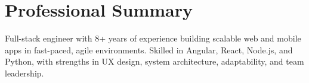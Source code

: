 \section{Professional Summary}
\noindent \normalsize Full-stack engineer with 8+ years of experience building scalable web and mobile apps in fast-paced, agile environments. Skilled in Angular, React, Node.js, and Python, with strengths in UX design, system architecture, adaptability, and team leadership.
\nopagebreak[4]